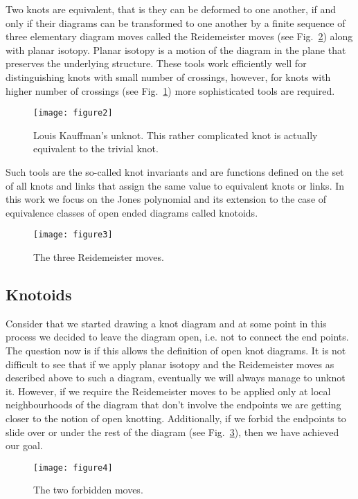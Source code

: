 Two knots are equivalent, that is they can be deformed to one another, if and only if their diagrams can be transformed to one another by a finite sequence of three elementary diagram moves called the Reidemeister moves (see Fig.~\ref{fig:rmoves}) along with planar isotopy. Planar isotopy is a motion of the diagram in the plane that preserves the underlying structure. These tools work efficiently well for distinguishing knots with small number of crossings, however, for knots with higher number of crossings (see Fig.~\ref{fig:unknot}) more sophisticated tools are required.
\begin{figure}[h]
\centering
\texttt{[image: figure2]}
\caption{Louis Kauffman's unknot. This rather complicated knot is actually equivalent to the trivial knot.}\label{fig:unknot}
\end{figure}

 Such tools are the so-called knot invariants and are functions defined on the set of all knots and links that assign the same value to equivalent knots or links. In this work we focus on the Jones polynomial\cite{jones} and its extension to the case of equivalence classes of open ended diagrams called knotoids\cite{turaev,guka}.

\begin{figure}[h]
\centering
\texttt{[image: figure3]}
\caption{The three Reidemeister moves.}\label{fig:rmoves}
\end{figure}


\subsection{\label{sec:theory:knotoids}Knotoids}
Consider that we started drawing a knot diagram and at some point in this process we decided to leave the diagram open, i.e. not to connect the end points. The question now is if this allows the definition of open knot diagrams. It is not difficult to see that if we apply planar isotopy and the Reidemeister moves as described above to such a diagram, eventually we will always manage to unknot it. However, if we require the Reidemeister moves to be applied only at local neighbourhoods of the diagram that don't involve the endpoints we are getting closer to the notion of open knotting. Additionally, if we forbid the endpoints to slide over or under the rest of the diagram (see Fig.~\ref{fig:forbidden}), then we have achieved our goal. 

\begin{figure}[h]
\centering
\texttt{[image: figure4]}
\caption{The two forbidden moves.}\label{fig:forbidden}
\end{figure}

